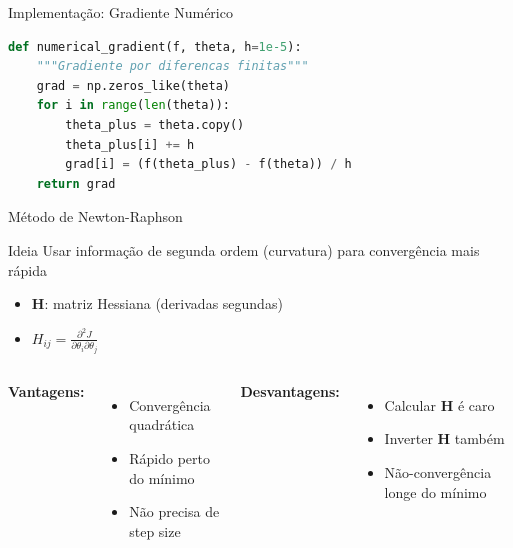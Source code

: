 \begin{frame}[fragile]{Implementação: Gradiente Numérico}
\begin{lstlisting}[language=Python, caption=Calculo numerico do gradiente, basicstyle=\ttfamily\scriptsize]
def numerical_gradient(f, theta, h=1e-5):
    """Gradiente por diferencas finitas"""
    grad = np.zeros_like(theta)
    for i in range(len(theta)):
        theta_plus = theta.copy()
        theta_plus[i] += h
        grad[i] = (f(theta_plus) - f(theta)) / h
    return grad
\end{lstlisting}
\end{frame}

\begin{frame}{Método de Newton-Raphson}
\begin{block}{Ideia}
Usar informação de segunda ordem (curvatura) para convergência mais rápida
\end{block}


\begin{itemize}\small
    \item $\mathbf{H}$: matriz Hessiana (derivadas segundas)
    \item $H_{ij} = \frac{\partial^2 J}{\partial \theta_i \partial \theta_j}$
\end{itemize}

\begin{columns}
\textbf{Vantagens:}
\begin{itemize}\small
    \item Convergência quadrática
    \item Rápido perto do mínimo
    \item Não precisa de step size
\end{itemize}

\textbf{Desvantagens:}
\begin{itemize}\small
    \item Calcular $\mathbf{H}$ é caro
    \item Inverter $\mathbf{H}$ também
    \item Não-convergência longe do mínimo
\end{itemize}
\end{columns}
\end{frame}

